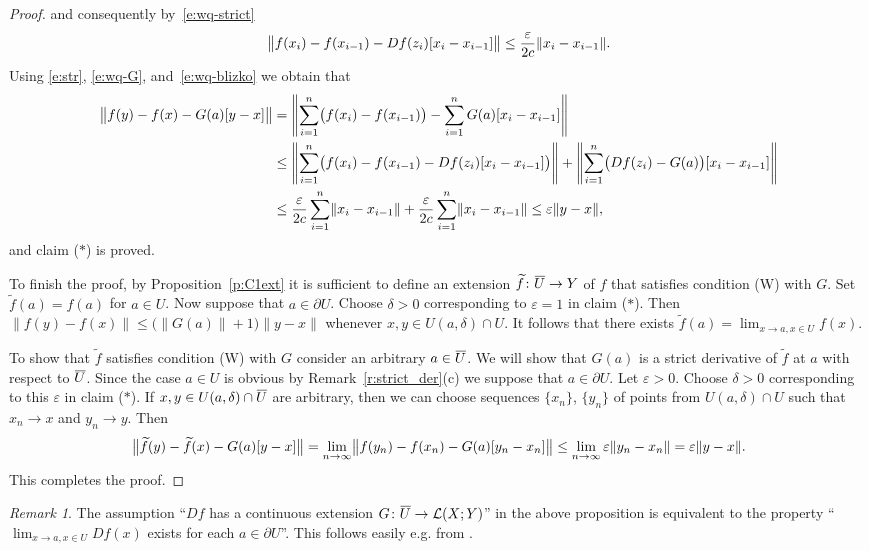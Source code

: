 \documentclass[a4paper,twoside,10pt,reqno,draft]{amsart}
\let\wtilde=\widetilde
\theoremstyle{definition}
\theoremstyle{remark}
\newtheorem{remark}[theorem]{Remark}
\newcommand\norm[1]{\mathopen\|#1\mathclose\|}
\newcommand\norma[1]{\left\|#1\right\|}
\newcommand\normb[2]{\csname#1l\endcsname\|#2\csname#1r\endcsname\|}
\newcommand{\cl}[2][3]{{}\mkern#1mu\overline{\mkern-#1mu#2}}
\newcommand\de{\delta}
\newcommand\ve{\varepsilon}
\newcommand\bdry{\partial}
\newcommand\lin[2]{\mathcal L(#1;#2)}
\newcommand\cW{(W)}
\begin{document}
\begin{proof}
and consequently by~\eqref{e:wq-strict}
\begin{equation}\label{e:str}
\normb{big}{f(x_i)-f(x_{i-1})-Df(z_i)[x_i-x_{i-1}]}\le\frac\ve{2c}\norm{x_i-x_{i-1}}.
\end{equation}
Using \eqref{e:str}, \eqref{e:wq-G}, and~\eqref{e:wq-blizko} we obtain that
\[\begin{split}
\normb{big}{f(y)-f(x)-G(a)[y-x]}&=\norma{\sum_{i=1}^n\bigl(f(x_i)-f(x_{i-1})\bigr)-\sum_{i=1}^nG(a)[x_i-x_{i-1}]}\\
&\le\norma{\sum_{i=1}^n\bigl(f(x_i)-f(x_{i-1})-Df(z_i)[x_i-x_{i-1}]\bigr)}+\norma{\sum_{i=1}^n\bigl(Df(z_i)-G(a)\bigr)[x_i-x_{i-1}]}\\
&\le\frac\ve{2c}\sum_{i=1}^n\norm{x_i-x_{i-1}}+\frac\ve{2c}\sum_{i=1}^n\norm{x_i-x_{i-1}}\le\ve\norm{y-x},
\end{split}\]
and claim ($*$) is proved.

To finish the proof, by Proposition~\ref{p:C1ext} it is sufficient to define an extension $\wtilde f\colon\cl[1]U\to Y$ of $f$ that satisfies condition {\cW} with $G$.
Set $\wtilde f(a)=f(a)$ for $a\in U$.
Now suppose that $a\in\bdry U$.
Choose $\de>0$ corresponding to $\ve=1$ in claim ($*$).
Then $\norm{f(y)-f(x)}\le\bigl(\norm{G(a)}+1\bigr)\norm{y-x}$ whenever $x,y\in U(a,\de)\cap U$.
It follows that there exists $\wtilde f(a)=\lim_{x\to a,x\in U}f(x)$.

To show that $\wtilde f$ satisfies condition {\cW} with $G$ consider an arbitrary $a\in\cl[1]U$.
We will show that $G(a)$ is a strict derivative of $\wtilde f$ at $a$ with respect to $\cl[1]U$.
Since the case $a\in U$ is obvious by Remark~\ref{r:strict_der}(c) we suppose that $a\in\bdry U$.
Let $\ve>0$.
Choose $\de>0$ corresponding to this $\ve$ in claim ($*$).
If $x,y\in U(a,\de)\cap\cl[1]U$ are arbitrary, then we can choose sequences $\{x_n\}$, $\{y_n\}$ of points from $U(a,\de)\cap U$ such that $x_n\to x$ and $y_n\to y$.
Then
\[
\normb{big}{\wtilde f(y)-\wtilde f(x)-G(a)[y-x]}=\lim_{n\to\infty}\normb{big}{f(y_n)-f(x_n)-G(a)[y_n-x_n]}\le\lim_{n\to\infty}\ve\norm{y_n-x_n}=\ve\norm{y-x}.
\]
This completes the proof.
\end{proof}

\begin{remark}
The assumption ``$Df$ has a continuous extension $G\colon\cl[1]U\to\lin XY$'' in the above proposition is equivalent to the property ``$\lim_{x\to a, x\in U}Df(x)$ exists for each $a\in\bdry U$''.
This follows easily e.g. from \cite[Lemma~4.3.16]{Engelking}.
\end{remark}
\end{document}
